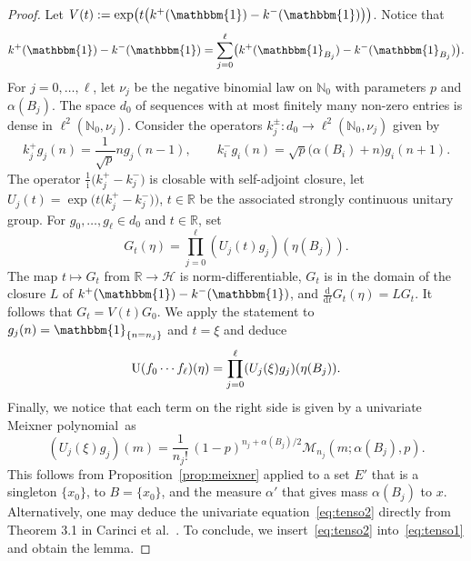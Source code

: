 \documentclass[10pt,a4paper]{amsart}
\numberwithin{equation}{section}
\newcommand{\N}{\mathbb{N}}
\newcommand{\R}{\mathbb{R}}
\newcommand{\dd}{\mathrm{d}} %
\newcommand{\1}{\mathbbm{1}}
\begin{document}
\begin{proof}
	Let $V(t):= \exp\bigl( t \bigl(k^+(\1) - k^-(\1)\bigr)\bigr)$. Notice that
	\[
		k^+(\1) - k^-(\1) = \sum_{j=0}^\ell \bigl( k^+(\1_{B_j}) - k^-(\1_{B_j})\bigr).
	\]
	For $j=0,\ldots,\ell$, let $\nu_j$ be the negative binomial law on $\N_0$ with parameters $p$ and $\alpha(B_j)$. The space $d_0$ of sequences with at most finitely many non-zero entries is dense in $\ell^2(\N_0,\nu_j)$. Consider the operators $k_j^\pm\colon d_0\to \ell^2(\N_0,\nu_j)$ given by
	\[
		k_j^+ g_j(n) = \frac{1}{\sqrt p} n g_{j}(n -1),\qquad k_i^- g_i(n) = \sqrt{p} \bigl(\alpha(B_{i})+n\bigr) g_i(n+1).
	\]
	The operator $\frac{ 1} {\mathrm i} \bigl(k_j^+- k_j^-\bigr)$ is closable with self-adjoint closure, let $U_j(t) = \exp\bigl( t \bigl(k_j^+-k_j^-\bigr)\bigr)$, $t\in \R$ be the associated strongly continuous unitary group.
	For $g_0,\ldots, g_\ell \in d_0$ and $t\in \R$, set
	\[
		G_t(\eta) = \prod_{j=0}^\ell ( U_j(t) g_j)( \eta(B_j)).
	\]
	The map $t\mapsto G_t$ from $\R\to \mathcal H$ is norm-differentiable, $G_t$ is in the domain of the closure $L$ of $k^+(\1)-k^-(\1)$, and $\frac{\dd}{\dd t} G_t(\eta) = L G_t$. It follows that $G_t = V(t) G_0$. We apply the statement to $g_j(n) = \1_{\{n=n_j\}}$ and $t=\xi$ and deduce
	\begin{equation} \label{eq:tenso1}
		{\rm U}(f_0\cdots f_\ell) (\eta) = \prod_{j=0}^\ell ( U_j(\xi) g_j)( \eta(B_j)).
	\end{equation}
	Finally, we notice that each term on the right side is given by a univariate Meixner polynomial~as%
	\begin{equation} \label{eq:tenso2}
		( U_j(\xi) g_j)(m) = \frac{1}{n_j!}\, (1-p)^{n_j+\alpha(B_j)/2} \mathcal M_{n_j}(m;\alpha(B_j),p).
	\end{equation}
	This follows from Proposition~\ref{prop:meixner} applied to a set $E'$ that is a singleton $\{x_0\}$, to $B= \{x_0\}$, and the measure $\alpha'$ that gives mass $\alpha(B_j)$ to $x$. Alternatively, one may deduce the univariate equation~\eqref{eq:tenso2} directly from Theorem 3.1 in Carinci et al.~\cite{carinci2019orthogonal}.
	To conclude, we insert~\eqref{eq:tenso2} into~\eqref{eq:tenso1} and obtain the lemma.
\end{proof}
\end{document}
